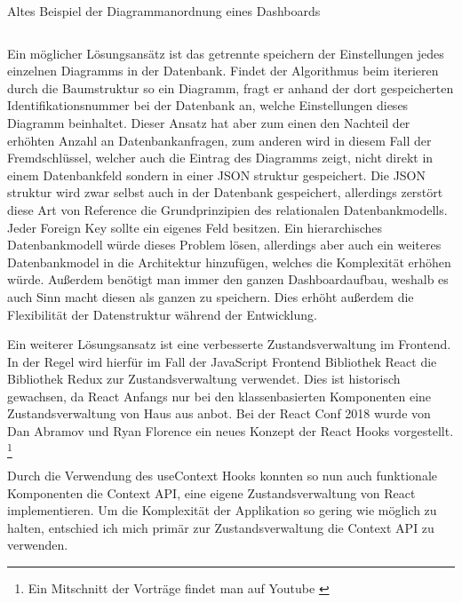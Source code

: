 \begin{listing}
    \label{lst:HelloJSX}
    \caption{Altes Beispiel der Diagrammanordnung eines Dashboards }
    \inputminted{jsx}{snippets/json/OldArrangement.json}
\end{listing}

Ein möglicher Lösungsansätz ist das getrennte speichern der Einstellungen jedes
einzelnen Diagramms in der Datenbank. Findet der Algorithmus beim iterieren durch
die Baumstruktur so ein Diagramm, fragt er anhand der dort gespeicherten 
Identifikationsnummer bei der Datenbank an, welche Einstellungen dieses Diagramm
beinhaltet. Dieser Ansatz hat aber zum einen den Nachteil der erhöhten Anzahl an
Datenbankanfragen, zum anderen wird in diesem Fall der Fremdschlüssel, welcher auch
die Eintrag des Diagramms zeigt, nicht direkt in einem Datenbankfeld sondern in einer
JSON struktur gespeichert. Die JSON struktur wird zwar selbst auch in der Datenbank 
gespeichert, allerdings zerstört diese Art von Reference die Grundprinzipien des
relationalen Datenbankmodells. Jeder Foreign Key sollte ein eigenes Feld besitzen.
Ein hierarchisches Datenbankmodell würde dieses Problem lösen, allerdings aber auch
ein weiteres Datenbankmodel in die Architektur hinzufügen, welches die Komplexität
erhöhen würde. Außerdem benötigt man immer den ganzen Dashboardaufbau, weshalb es
auch Sinn macht diesen als ganzen zu speichern. Dies erhöht außerdem die Flexibilität
der Datenstruktur während der Entwicklung.

Ein weiterer Lösungsansatz ist eine verbesserte Zustandsverwaltung im Frontend. In der
Regel wird hierfür im Fall der JavaScript Frontend Bibliothek React die Bibliothek
Redux zur Zustandsverwaltung verwendet. Dies ist historisch gewachsen, da React Anfangs
nur bei den klassenbasierten Komponenten eine Zustandsverwaltung von Haus aus
anbot. Bei der React Conf 2018 wurde von Dan Abramov und Ryan Florence ein neues
Konzept der React Hooks vorgestellt.
\footnote{Ein Mitschnitt der Vorträge findet man auf Youtube \cite{}}

Durch die Verwendung des useContext Hooks konnten
so nun auch funktionale Komponenten die Context API, eine eigene Zustandsverwaltung von React implementieren.
Um die Komplexität der Applikation so gering wie möglich zu halten, entschied ich mich
primär zur Zustandsverwaltung die Context API zu verwenden.





